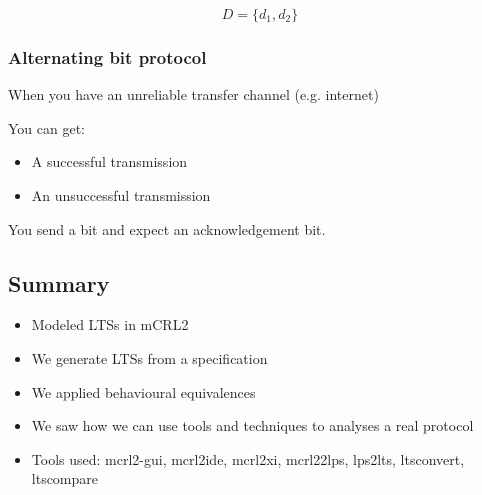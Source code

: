 $$
D = \{d_1, d_2\}
$$

\subsubsection{Alternating bit protocol}

When you have an unreliable transfer channel (e.g. internet)

You can get:
\begin{itemize}
  \item A successful transmission
  \item An unsuccessful transmission
\end{itemize}

You send a bit and expect an acknowledgement bit.

\subsection{Summary}
\begin{itemize}
  \item Modeled LTSs in mCRL2
  \item We generate LTSs from a specification
  \item We applied behavioural equivalences
  \item We saw how we can use tools and techniques to analyses a real protocol
  \item Tools used: mcrl2-gui, mcrl2ide, mcrl2xi, mcrl22lps, lps2lts, ltsconvert, ltscompare
\end{itemize}


